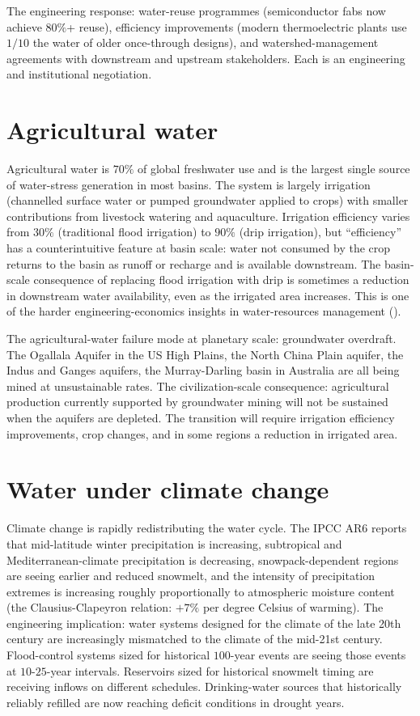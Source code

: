 The engineering response: water-reuse programmes (semiconductor fabs now achieve $80\%$+ reuse), efficiency improvements (modern thermoelectric plants use $1/10$ the water of older once-through designs), and watershed-management agreements with downstream and upstream stakeholders. Each is an engineering and institutional negotiation.

\section{Agricultural water}

Agricultural water is $70\%$ of global freshwater use and is the largest single source of water-stress generation in most basins. The system is largely irrigation (channelled surface water or pumped groundwater applied to crops) with smaller contributions from livestock watering and aquaculture. Irrigation efficiency varies from $30\%$ (traditional flood irrigation) to $90\%$ (drip irrigation), but ``efficiency'' has a counterintuitive feature at basin scale: water not consumed by the crop returns to the basin as runoff or recharge and is available downstream. The basin-scale consequence of replacing flood irrigation with drip is sometimes a reduction in downstream water availability, even as the irrigated area increases. This is one of the harder engineering-economics insights in water-resources management (\cite{paper:perry-irrigation-2007}).

The agricultural-water failure mode at planetary scale: groundwater overdraft. The Ogallala Aquifer in the US High Plains, the North China Plain aquifer, the Indus and Ganges aquifers, the Murray-Darling basin in Australia are all being mined at unsustainable rates. The civilization-scale consequence: agricultural production currently supported by groundwater mining will not be sustained when the aquifers are depleted. The transition will require irrigation efficiency improvements, crop changes, and in some regions a reduction in irrigated area.

\section{Water under climate change}

Climate change is rapidly redistributing the water cycle. The IPCC AR6 \cite{std:ipcc-ar6-wg1-2021} reports that mid-latitude winter precipitation is increasing, subtropical and Mediterranean-climate precipitation is decreasing, snowpack-dependent regions are seeing earlier and reduced snowmelt, and the intensity of precipitation extremes is increasing roughly proportionally to atmospheric moisture content (the Clausius-Clapeyron relation: $+7\%$ per degree Celsius of warming). The engineering implication: water systems designed for the climate of the late 20th century are increasingly mismatched to the climate of the mid-21st century. Flood-control systems sized for historical $100$-year events are seeing those events at $10$-$25$-year intervals. Reservoirs sized for historical snowmelt timing are receiving inflows on different schedules. Drinking-water sources that historically reliably refilled are now reaching deficit conditions in drought years.

